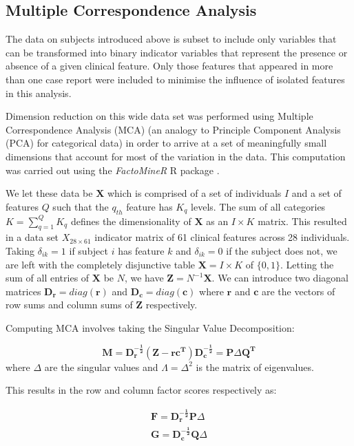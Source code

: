 \documentclass[
  authoryear,
  preprint,
  3p]{elsarticle}
\begin{document}
\hypertarget{multiple-correspondence-analysis}{%
\subsection{Multiple Correspondence
Analysis}\label{multiple-correspondence-analysis}}

The data on subjects introduced above is subset to include only
variables that can be transformed into binary indicator variables that
represent the presence or absence of a given clinical feature. Only
those features that appeared in more than one case report were included
to minimise the influence of isolated features in this analysis.

Dimension reduction on this wide data set was performed using Multiple
Correspondence Analysis (MCA) (an analogy to Principle Component
Analysis (PCA) for categorical data) \citep{le2010multiple} in order to
arrive at a set of meaningfully small dimensions that account for most
of the variation in the data. This computation was carried out using the
\emph{FactoMineR} R package \citep{factominer}.

We let these data be \(\mathbf{X}\) which is comprised of a set of
individuals \(I\) and a set of features \(Q\) such that the \(q_{th}\)
feature has \(K_q\) levels. The sum of all categories
\(K = \sum_{q=1}^{Q}K_q\) defines the dimensionality of \(\mathbf{X}\)
as an \(I\times K\) matrix. This resulted in a data set
\(X_{28 \times 61}\) indicator matrix of 61 clinical features across 28
individuals. Taking \(\delta_{ik} = 1\) if subject \(i\) has feature
\(k\) and \(\delta_{ik} = 0\) if the subject does not, we are left with
the completely disjunctive table \(\mathbf{X} = I\times K\) of
\(\{0,1\}\). Letting the sum of all entries of \(\mathbf{X}\) be \(N\),
we have \(\mathbf{Z} = N^{-1}\mathbf{X}\). We can introduce two diagonal
matrices \(\mathbf{D_r} = diag(\mathbf{r})\) and
\(\mathbf{D_c} = diag(\mathbf{c})\) where \(\mathbf{r}\) and
\(\mathbf{c}\) are the vectors of row sums and column sums of
\(\mathbf{Z}\) respectively.

Computing MCA involves taking the Singular Value Decomposition:

\[
\mathbf{M = D_r^{-\frac{1}{2}}(Z-rc^T)D_c^{-\frac{1}{2}}} = \mathbf{P}\Delta\mathbf{Q^T}
\] where \(\Delta\) are the singular values and \(\Lambda = \Delta^2\)
is the matrix of eigenvalues.

This results in the row and column factor scores respectively as:

\[
\begin{split}
\mathbf{F} = \mathbf{D_r^{-\frac{1}{2}}P}\Delta \\
\mathbf{G = D_c^{-\frac{1}{2}}Q}\Delta
\end{split}
\]
\end{document}
